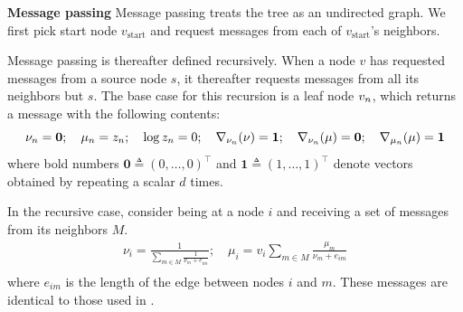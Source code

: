 \textbf{Message passing} Message
passing treats the tree as an undirected graph. 
We first pick start node $v_{\text{start}}$
and request messages from each of $v_{\text{start}}$'s neighbors.

Message passing is thereafter defined recursively. 
When a node $v$ has requested messages from a source node $s$,
it thereafter requests messages from all its neighbors but $s$.
The base case for this recursion is a leaf node $v_n$,
which returns a message with the following contents:
\begin{equation}
    \nu_n = \bm{0};\quad \mu_n = z_n;\quad \log z_n = 0;\quad \nabla_{\nu_n}(\nu) = \bm{1};\quad \nabla_{\nu_n}(\mu) = \bm{0};\quad \nabla_{\mu_n}(\mu) = \bm{1}
\end{equation}
where bold numbers $\bm{0}\triangleq (0,\ldots,0)^\top$ and $\bm{1}\triangleq (1,\ldots,1)^\top$ denote vectors obtained by repeating a scalar $d$ times.

In the recursive case, consider being at a node $i$ and receiving a set of messages from its neighbors $M$.
\begin{equation}
\begin{split}
    \nu_i = \frac{1}{\sum_{m \in M}\frac{1}{\nu_m + e_{im}}} ;\quad \mu_i = v_i \sum_{m \in M} \frac{\mu_m}{\nu_m + e_{im}}\\
\end{split}
\end{equation}
where $e_{im}$ is the length of the edge between nodes $i$ and $m$.
These messages are identical to those used in \citet{Boyles2012}.

